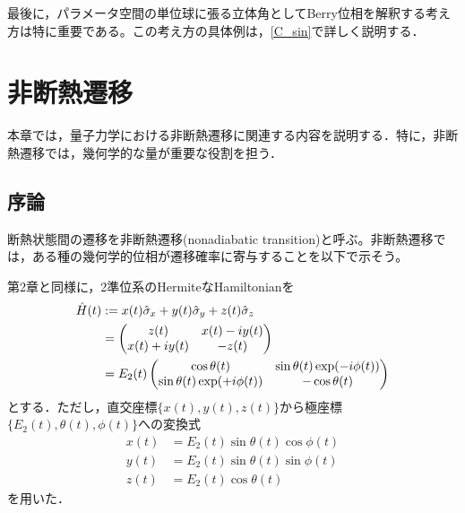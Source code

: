 \documentclass[a4paper, titlepage]{jsreport}
\begin{document}
最後に，パラメータ空間の単位球に張る立体角としてBerry位相を解釈する考え方は特に重要である。この考え方の具体例は，\ref{C_sin}で詳しく説明する．


\chapter{非断熱遷移}\label{NT}
本章では，量子力学における非断熱遷移に関連する内容を説明する．特に，非断熱遷移では，幾何学的な量が重要な役割を担う．


\section{序論}
断熱状態間の遷移を非断熱遷移(nonadiabatic transition)と呼ぶ。非断熱遷移では，ある種の幾何学的位相が遷移確率に寄与することを以下で示そう。


第2章と同様に，2準位系のHermiteなHamiltonianを
\begin{align}
  \Hat{H}(t)
  &:= x(t)\Hat{\sigma}_x + y(t) \Hat{\sigma}_y + z(t) \Hat{\sigma}_z\\
  &=
  \begin{pmatrix} 
  z(t) & x(t) - iy(t)\\
  x(t) + iy(t) & -z(t)\\
  \end{pmatrix}\\
  &= E_2(t)
  \begin{pmatrix} 
  \cos \theta(t) & \sin \theta(t) \exp(-i\phi(t))\\
  \sin \theta(t) \exp(+i\phi(t)) & -\cos \theta(t)\\
  \end{pmatrix}
\end{align}
とする．ただし，直交座標$\{x(t), y(t), z(t)\}$から極座標$\{E_2(t), \theta(t), \phi(t)\}$への変換式
\begin{align}
  x(t) &= E_2(t) \sin \theta(t) \cos \phi(t)\\
  y(t) &= E_2(t) \sin \theta(t) \sin \phi(t)\\
  z(t) &= E_2(t) \cos \theta(t)
\end{align}
を用いた．
\end{document}
